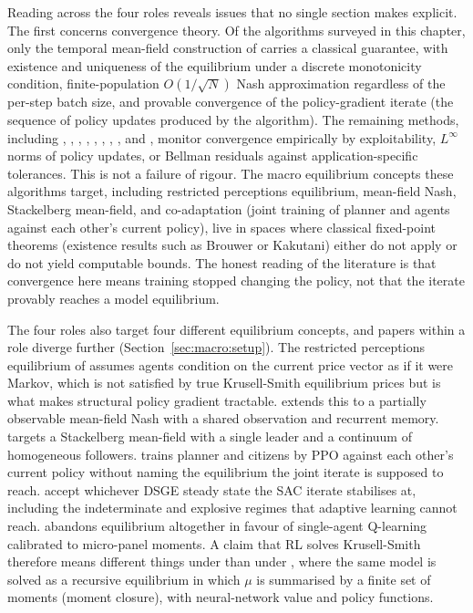 Reading across the four roles reveals issues that no single section
makes explicit. The first concerns convergence theory. Of the
algorithms surveyed in this chapter, only the temporal mean-field
construction of \citet{YangShan2026tmf} carries a classical
guarantee, with existence and uniqueness of the equilibrium under a
discrete monotonicity condition, finite-population
$O(1/\sqrt{N})$ Nash approximation regardless of the per-step batch
size, and provable convergence of the policy-gradient iterate (the
sequence of policy updates produced by the algorithm). The
remaining methods, including \citet{Yang2025srl},
\citet{Wibault2026rspg}, \citet{Kaplowitz2025},
\citet{Zheng2022aie}, \citet{Chen2021drl}, \citet{Mi2025dsmfg},
\citet{Han2022deepham}, \citet{Brunnbauer2024offmmd}, and
\citet{Magnino2025nonstationary}, monitor convergence empirically by
exploitability, $L^{\infty}$ norms of policy updates, or Bellman
residuals against application-specific tolerances. This is not a
failure of rigour. The macro equilibrium concepts these algorithms
target, including restricted perceptions equilibrium, mean-field
Nash, Stackelberg mean-field, and co-adaptation (joint training of
planner and agents against each other's current policy), live in
spaces where classical fixed-point theorems (existence results such
as Brouwer or Kakutani) either do not apply or do not
yield computable bounds. The honest reading of the literature is
that convergence here means training stopped changing the policy,
not that the iterate provably reaches a model equilibrium.

The four roles also target four different equilibrium concepts,
and papers within a role diverge further
(Section~\ref{sec:macro:setup}). The restricted perceptions
equilibrium of \citet{Yang2025srl} assumes agents condition on the
current price vector as if it were Markov, which is not satisfied by
true Krusell-Smith equilibrium prices but is what makes structural
policy gradient tractable. \citet{Wibault2026rspg} extends this to a
partially observable mean-field Nash with a shared observation and
recurrent memory. \citet{Mi2025dsmfg} targets a Stackelberg
mean-field with a single leader and a continuum of homogeneous
followers. \citet{Zheng2022aie} trains planner and citizens by PPO
against each other's current policy without naming the equilibrium
the joint iterate is supposed to reach. \citet{Chen2021drl} accept
whichever DSGE steady state the SAC iterate stabilises at, including
the indeterminate and explosive regimes that adaptive learning
cannot reach. \citet{Kaplowitz2025} abandons equilibrium altogether
in favour of single-agent Q-learning calibrated to micro-panel
moments. A claim that RL solves Krusell-Smith therefore means
different things under \citet{Yang2025srl} than under
\citet{Han2022deepham}, where the same model is solved as a
recursive equilibrium in which $\mu$ is summarised by a finite set
of moments (moment closure), with neural-network value and policy
functions.

